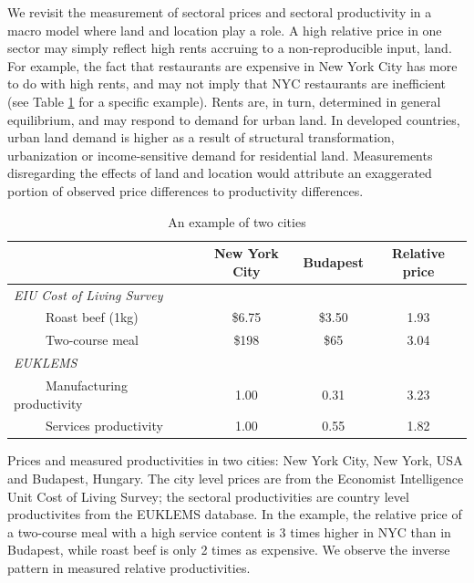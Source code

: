 \documentclass[12pt]{article}
\begin{document}
We revisit the measurement of sectoral prices and sectoral productivity in a macro model where land and location play a role. A high relative price in one sector may simply reflect high rents accruing to a non-reproducible input, land. For example, the fact that restaurants are expensive in New York City has more to do with high rents, and may not imply that NYC restaurants are inefficient (see Table \ref{tab:EIU} for a specific example). Rents are, in turn, determined in general equilibrium, and may respond to demand for urban land. In developed countries, urban land demand is higher as a result of structural transformation, urbanization or income-sensitive demand for residential land. Measurements disregarding the effects of land and location would attribute an exaggerated portion of observed price differences to productivity differences. %

\begin{table}[h!]
\caption{An example of two cities\label{tab:EIU}}
\begin{center}
\begin{tabular}{lccc}
 & \textbf{New York City} & \textbf{Budapest} & \textbf{Relative price} \\ \hline
 \emph{EIU Cost of Living Survey} & & & \\
 ~~~~~Roast beef (1kg)            & \$6.75  & \$3.50  & 1.93 \\
 ~~~~~Two-course meal             & \$198   & \$65    & 3.04 \\
 \emph{EUKLEMS}                   & & & \\
 ~~~~~Manufacturing productivity  & 1.00    & 0.31    & 3.23 \\
 ~~~~~Services productivity       & 1.00    & 0.55    & 1.82 \\ %
\end{tabular}
\end{center}
\noindent \footnotesize{Prices and measured productivities in two cities: New York City, New York, USA and Budapest, Hungary. The city level prices are from the Economist Intelligence Unit Cost of Living Survey; the sectoral productivities are country level productivites from the EUKLEMS database. In the example, the relative price of a two-course meal with a high service content is 3 times higher in NYC than in Budapest, while roast beef is only 2 times as expensive. We observe the inverse pattern in measured relative productivities.}
\end{table}
\end{document}

